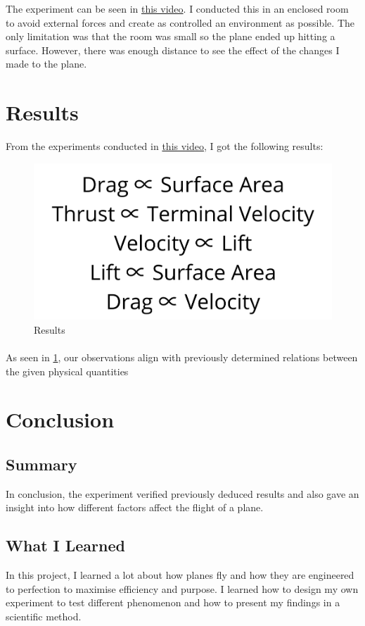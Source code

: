 \documentclass[12pt]{article}
\begin{document}
The experiment can be seen in \href{https://youtu.be/qcbdRIKSDts}{this video}. I conducted this in an enclosed room to avoid external forces and create as controlled an environment as possible. The only limitation was that the room was small so the plane ended up hitting a surface. However, there was enough distance to see the effect of the changes I made to the plane.
\section{Results}
From the experiments conducted in \href{https://youtu.be/qcbdRIKSDts}{this video}, I got the following results:
\begin{figure}[h!]
\begin{center}
\includegraphics[scale=0.4]{conclusions}
\end{center}
\caption{Results}
\label{fig:results}
\end{figure}
\paragraph{}
As seen in \ref{fig:results}, our observations align with previously determined relations between the given physical quantities
\section{Conclusion}
\subsection{Summary}
In conclusion, the experiment verified previously deduced results and also gave an insight into how different factors affect the flight of a plane.
\subsection{What I Learned}
In this project, I learned a lot about how planes fly and how they are engineered to perfection to maximise efficiency and purpose. I learned how to design my own experiment to test different phenomenon and how to present my findings in a scientific method.
\end{document}

